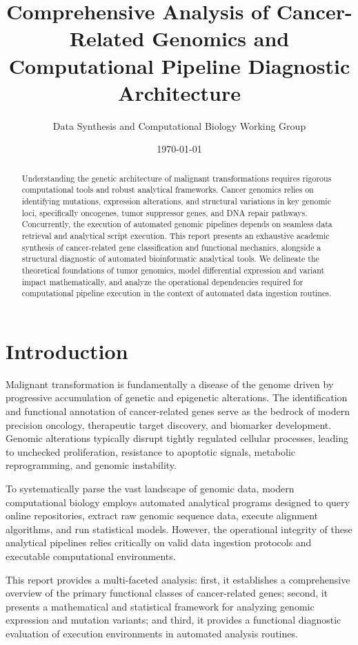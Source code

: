 \documentclass{article}
\title{Comprehensive Analysis of Cancer-Related Genomics and Computational Pipeline Diagnostic Architecture}
\author{Data Synthesis and Computational Biology Working Group}
\date{\today}
\begin{document}
\maketitle

\begin{abstract}
Understanding the genetic architecture of malignant transformations requires rigorous computational tools and robust analytical frameworks. Cancer genomics relies on identifying mutations, expression alterations, and structural variations in key genomic loci, specifically oncogenes, tumor suppressor genes, and DNA repair pathways. Concurrently, the execution of automated genomic pipelines depends on seamless data retrieval and analytical script execution. This report presents an exhaustive academic synthesis of cancer-related gene classification and functional mechanics, alongside a structural diagnostic of automated bioinformatic analytical tools. We delineate the theoretical foundations of tumor genomics, model differential expression and variant impact mathematically, and analyze the operational dependencies required for computational pipeline execution in the context of automated data ingestion routines.
\end{abstract}

\section{Introduction}

Malignant transformation is fundamentally a disease of the genome driven by progressive accumulation of genetic and epigenetic alterations. The identification and functional annotation of cancer-related genes serve as the bedrock of modern precision oncology, therapeutic target discovery, and biomarker development. Genomic alterations typically disrupt tightly regulated cellular processes, leading to unchecked proliferation, resistance to apoptotic signals, metabolic reprogramming, and genomic instability.

To systematically parse the vast landscape of genomic data, modern computational biology employs automated analytical programs designed to query online repositories, extract raw genomic sequence data, execute alignment algorithms, and run statistical models. However, the operational integrity of these analytical pipelines relies critically on valid data ingestion protocols and executable computational environments.

This report provides a multi-faceted analysis: first, it establishes a comprehensive overview of the primary functional classes of cancer-related genes; second, it presents a mathematical and statistical framework for analyzing genomic expression and mutation variants; and third, it provides a functional diagnostic evaluation of execution environments in automated analysis routines.
\end{document}

